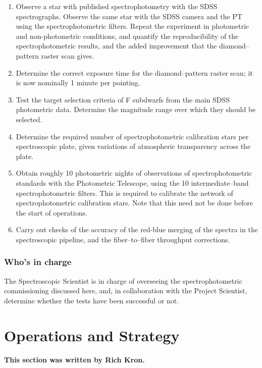 \begin{enumerate}

\item Observe a star with published spectrophotometry with the SDSS
spectrographs.  Observe the same star with the SDSS camera and the PT
using the spectrophotometric filters. Repeat the experiment in photometric
and non-photometric conditions, and quantify the reproducibility of
the spectrophotometric results, and the added improvement that the
diamond--pattern raster scan gives.

\item Determine the correct exposure time for the
diamond--pattern raster scan; it is now nominally 1 minute per
pointing.

\item Test the target selection criteria of F subdwarfs from the main
SDSS photometric data.  Determine the magnitude range over which they
should be selected. 

\item Determine the required number of spectrophotometric calibration
stars per spectroscopic plate, given variations of atmospheric
transparency across the plate. 

\item Obtain roughly 10 photometric nights of observations of
spectrophotometric standards with the
Photometric Telescope, using the 10 intermediate--band
spectrophotometric filters. This is required to calibrate
the network of spectrophotometric calibration stars.  Note that this
need not be done before the start of operations. 

\item Carry out checks of the accuracy of the red-blue merging of the
spectra in the spectroscopic pipeline, and the 
fiber--to--fiber throughput corrections.
\end{enumerate}

\subsubsection{Who's in charge}

The Spectroscopic Scientist is in charge of overseeing the
spectrophotometric commissioning discussed here, and, in collaboration
with the Project Scientist, determine whether the tests have been
successful or not.

\section{Operations and Strategy}
\label{sec:operations}
{\bf This section was written by Rich Kron.}

